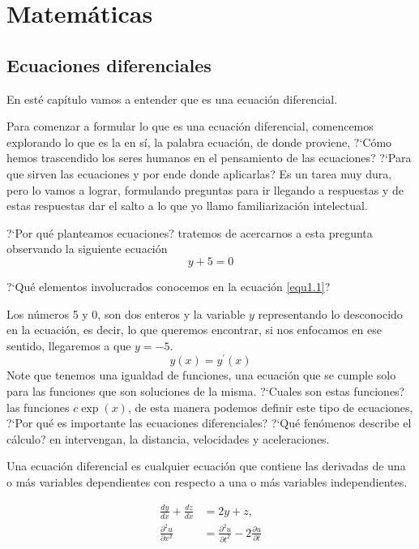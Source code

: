\part{Matem\'aticas}

\chapter{Ecuaciones diferenciales}
En est\'e cap\'itulo vamos a entender que es una ecuaci\'on diferencial. 

Para comenzar a formular lo que es una ecuaci\'on diferencial, comencemos explorando lo que es la en s\'i, la palabra ecuaci\'on, de donde proviene, ?`C\'omo hemos trascendido los seres humanos en el pensamiento de las ecuaciones? ?`Para que sirven las ecuaciones y por ende donde aplicarlas? Es un tarea muy dura, pero lo vamos a lograr, formulando  preguntas para ir llegando a respuestas y de estas respuestas dar el salto a lo que yo llamo familiarizaci\'on intelectual. 

?`Por qu\'e planteamos ecuaciones? tratemos de acercarnos a esta pregunta observando la siguiente ecuaci\'on
\begin{equation}\label{equ1.1}
	y+5 = 0
\end{equation}

?`Qu\'e elementos involucrados conocemos en la ecuaci\'on \ref{equ1.1}?

Los n\'umeros 5 y 0, son dos enteros y la variable $y$ representando lo desconocido en la ecuaci\'on, es decir, lo que queremos encontrar, si nos enfocamos en ese sentido, llegaremos a que $y=-5$. 
\begin{equation}
	y(x)=y^{\prime}(x)
\end{equation}
Note que tenemos una igualdad de funciones, una ecuaci\'on que se cumple solo para las funciones que son soluciones de la misma. ?`Cuales son estas funciones? las funciones $c\exp(x)$, de esta manera podemos definir este tipo de ecuaciones, ?`Por qu\'e es importante las ecuaciones diferenciales? ?`Qu\'e fen\'omenos describe el c\'alculo? en intervengan, la distancia, velocidades y aceleraciones.

\begin{definicion}
Una ecuaci\'on diferencial es cualquier ecuaci\'on que contiene las derivadas de una o m\'as variables dependientes con respecto a una o m\'as variables independientes.
\end{definicion}
\begin{ejemplo}
	\begin{align}
		\frac{dy}{dx} + \frac{dz}{dx} &= 2y + z, \\
		\frac{\partial^{2}u}{\partial{x^{2}}} &= \frac{\partial^{2}u}{\partial t^{2}} - 2\frac{\partial u}{\partial t} 
	\end{align}
\end{ejemplo}



